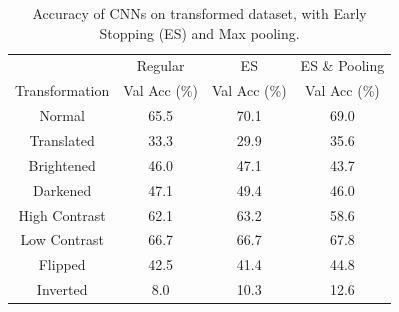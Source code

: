 \begin{table}[ht!]
\centering
\begin{tabular}{||c c c c||}  
 \hline
  & Regular & ES & ES \& Pooling \\
 Transformation & Val Acc (\%) & Val Acc (\%) & Val Acc (\%) \\ [0.3ex] 
 \hline\hline
 Normal & 65.5 & 70.1 & 69.0 \\ \hline
 Translated & 33.3 & 29.9 & 35.6 \\ \hline
 Brightened & 46.0 & 47.1 & 43.7 \\ \hline
 Darkened & 47.1 & 49.4 & 46.0 \\ \hline
 High Contrast & 62.1 & 63.2 & 58.6 \\ \hline
 Low Contrast & 66.7 & 66.7 & 67.8 \\ \hline
 Flipped & 42.5 & 41.4 & 44.8 \\ \hline
 Inverted & 8.0 & 10.3 & 12.6 \\ \hline
\end{tabular}
\caption{Accuracy of CNNs on transformed dataset, with Early Stopping (ES) and Max pooling.}
\label{table_2_4}
\end{table}



